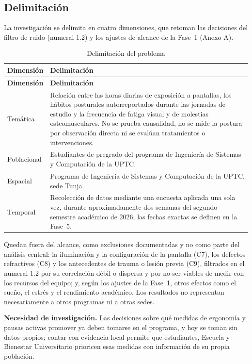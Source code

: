 \subsection{Delimitación}

La investigación se delimita en cuatro dimensiones, que retoman las decisiones del
filtro de ruido (numeral 1.2) y los ajustes de alcance de la Fase~1 (Anexo A).

\bigskip
\begin{center}
\begin{longtable}{L{2.6cm} L{12.2cm}}
\caption{Delimitación del problema} \\
\toprule
\textbf{Dimensión} & \textbf{Delimitación} \\
\midrule
\endfirsthead
\toprule
\textbf{Dimensión} & \textbf{Delimitación} \\
\midrule
\endhead
Temática & Relación entre las horas diarias de exposición a pantallas, los hábitos posturales autorreportados durante las jornadas de estudio y la frecuencia de fatiga visual y de molestias osteomusculares. No se prueba causalidad, no se mide la postura por observación directa ni se evalúan tratamientos o intervenciones. \\
\midrule
Poblacional & Estudiantes de pregrado del programa de Ingeniería de Sistemas y Computación de la UPTC. \\
\midrule
Espacial & Programa de Ingeniería de Sistemas y Computación de la UPTC, sede Tunja. \\
\midrule
Temporal & Recolección de datos mediante una encuesta aplicada una sola vez, durante aproximadamente dos semanas del segundo semestre académico de 2026; las fechas exactas se definen en la Fase~5. \\
\bottomrule
\end{longtable}
\end{center}

\noindent Quedan fuera del alcance, como exclusiones documentadas y no como parte del
análisis central: la iluminación y la configuración de la pantalla (C7), los defectos
refractivos (C8) y los antecedentes de trauma o lesión previa (C9), filtrados en el
numeral 1.2 por su correlación débil o dispersa y por no ser viables de medir con los
recursos del equipo; y, según los ajustes de la Fase~1, otros efectos como el sueño, el
estrés y el rendimiento académico. Los resultados no representan necesariamente a otros
programas ni a otras sedes.

\medskip
\noindent\textbf{Necesidad de investigación.} Las decisiones sobre qué medidas de
ergonomía y pausas activas promover ya deben tomarse en el programa, y hoy se toman sin
datos propios; contar con evidencia local permite que estudiantes, Escuela y Bienestar
Universitario prioricen esas medidas con información de su propia población.
